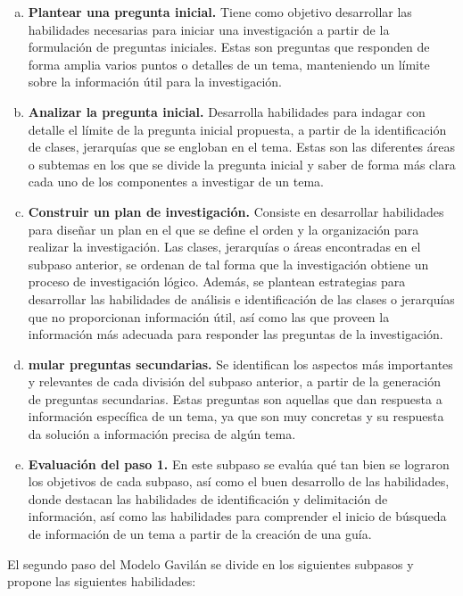 \begin{enumerate}[a.]
  \item \textbf{Plantear una pregunta inicial.} Tiene como objetivo desarrollar las habilidades necesarias para iniciar una investigación a partir de la formulación de preguntas iniciales. Estas son preguntas que responden de forma amplia varios puntos o detalles de un tema, manteniendo un límite sobre la información útil para la investigación.
  \item \textbf{Analizar la pregunta inicial.} Desarrolla habilidades para indagar con detalle el límite de la pregunta inicial propuesta, a partir de la identificación de clases, jerarquías que se engloban en el tema. Estas son las diferentes áreas o subtemas en los que se divide la pregunta inicial y saber de forma más clara cada uno de los componentes a investigar de un tema.
  \item \textbf{Construir un plan de investigación.} Consiste en desarrollar habilidades para diseñar un plan en el que se define el orden y la organización para realizar la investigación. Las clases, jerarquías o áreas encontradas en el subpaso anterior, se ordenan de tal forma que la investigación obtiene un proceso de investigación lógico. Además, se plantean estrategias para desarrollar las habilidades de análisis e identificación de las clases o jerarquías que no proporcionan información útil, así como las que proveen la información más adecuada para responder las preguntas de la investigación. 
  \item \textbf{mular preguntas secundarias.} Se identifican los aspectos más importantes y relevantes de cada división del subpaso anterior, a partir de la generación de preguntas secundarias. Estas preguntas son aquellas que dan respuesta a información específica de un tema, ya que son muy concretas y su respuesta da solución a información precisa de algún tema.
  \item \textbf{Evaluación del paso 1.} En este subpaso se evalúa qué tan bien se lograron los objetivos de cada subpaso, así como el buen desarrollo de las habilidades, donde destacan las habilidades de identificación y delimitación de información, así como las habilidades para comprender el inicio de búsqueda de información de un tema a partir de la creación de una guía.
\end{enumerate}

El segundo paso del Modelo Gavilán se divide en los siguientes subpasos y propone las siguientes habilidades:


